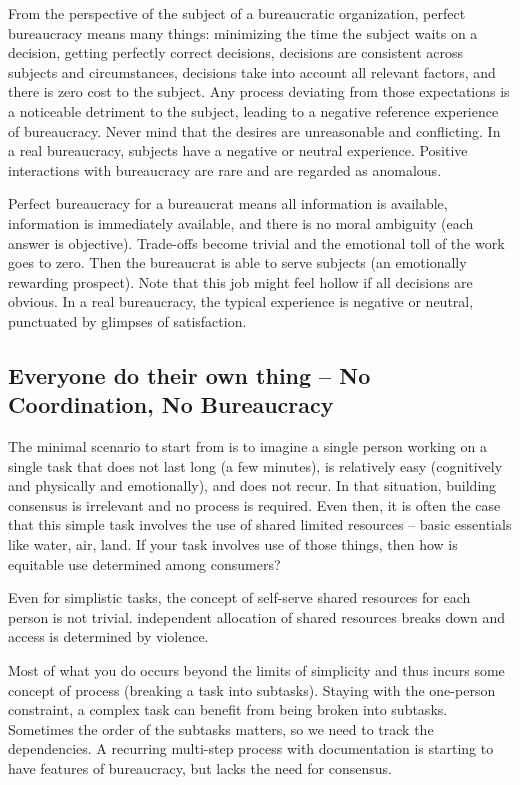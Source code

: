 From the perspective of the subject of a bureaucratic organization, perfect bureaucracy means many things: minimizing the time the subject waits on a decision, getting perfectly correct decisions, decisions are consistent across subjects and circumstances, decisions take into account all relevant factors, and there is zero cost to the subject. Any process deviating from those expectations is a noticeable detriment to the subject, leading to a negative reference experience of bureaucracy. Never mind that the desires are unreasonable and conflicting. In a real bureaucracy, subjects have a negative or neutral experience. Positive interactions with bureaucracy are rare and are regarded as anomalous.

Perfect bureaucracy for a bureaucrat means all information is available, information is immediately available, and there is no moral ambiguity (each answer is objective). Trade-offs become trivial and the emotional toll of the work goes to zero. Then the bureaucrat is able to serve subjects (an emotionally rewarding prospect). Note that this job might feel hollow if all decisions are obvious. In a real bureaucracy, the typical experience is negative or neutral, punctuated by glimpses of satisfaction. 

\subsection*{Everyone do their own thing -- No Coordination, No Bureaucracy}
The minimal scenario to start from is to imagine a single person working on a single task that does not last long (a few minutes), is relatively easy (cognitively and physically and emotionally), and does not recur. In that situation, building consensus is irrelevant and no process is required. Even then, it is often the case that this simple task involves the use of shared limited resources -- basic essentials like water, air, land. If your task involves use of those things, then how is equitable use determined among consumers?

Even for simplistic tasks, the concept of self-serve shared resources for each person is not trivial. independent allocation of shared resources breaks down and access is determined by violence.

Most of what you do occurs beyond the limits of simplicity and thus incurs some concept of \gls{process} (breaking a task into subtasks). Staying with the one-person constraint, a complex task can benefit from being broken into subtasks. Sometimes the order of the subtasks matters, so we need to track the dependencies. A recurring multi-step process with documentation is starting to have features of bureaucracy, but lacks the need for consensus. 


